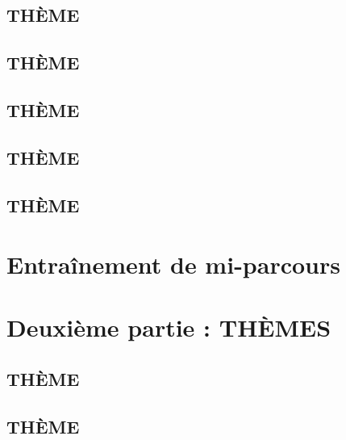 \documentclass[poly,trombi]{valbonne}
\begin{document}
\subsection{THÈME}


\subsection{THÈME}


\subsection{THÈME}


\subsection{THÈME}


\subsection{THÈME}






\section{Entraînement de mi-parcours}








\section{Deuxième partie : THÈMES}

\subsection{THÈME}


\subsection{THÈME}
\end{document}
